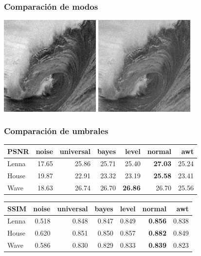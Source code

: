 \documentclass{beamer}
\begin{document}
  \begin{frame}
    \frametitle{ Comparación de modos }
    \centering
    \includegraphics[width=5cm]{imgs/Modes/2_normal_soft_sym8_Wave.jpg}
    \includegraphics[width=5cm]{imgs/Modes/2_normal_hard_sym8_Wave.jpg}

  \end{frame}

  \begin{frame}
    \frametitle{ Comparación de umbrales }
    \centering
    \begin{tabular}{lrrrrrr}
      \toprule
      {PSNR} &  noise &  universal &  bayes &  level &  normal &    awt \\
      \midrule
      Lenna &  17.65 &      25.86 &  25.71 &  25.40 &   \bf{27.03} &  25.24 \\
      House &  19.87 &      22.91 &  23.32 &  23.19 &   \bf{25.58} &  23.41 \\
      Wave &  18.63 &      26.74 &  26.70 &  \bf{26.86} &   26.70 &  25.56 \\
      \bottomrule
      \end{tabular}
      \begin{tabular}{lrrrrrr}
        {SSIM} &  noise &  universal &  bayes &  level &  normal &    awt \\
        \midrule
        Lenna &  0.518 &   0.848 &  0.847 &  0.849 &  \bf{0.856} &  0.838 \\
        House &  0.620 &   0.851 &  0.850 &  0.857 &  \bf{0.882} &  0.849 \\
        Wave &  0.586 &   0.830 &  0.829 &  0.833 &  \bf{0.839} &  0.823 \\
        \bottomrule
        \end{tabular}



  \end{frame}
\end{document}
